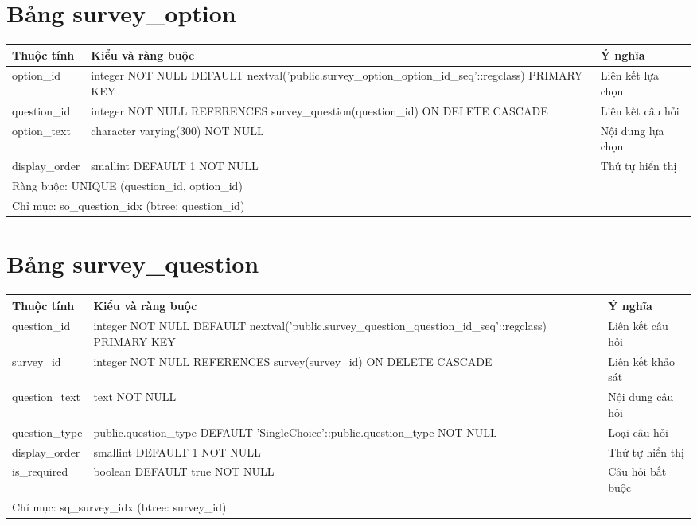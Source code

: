 \section{Bảng survey\_option}
\begin{longtable}{|p{}|p{}|p{}|}\hline
\textbf{Thuộc tính}&\textbf{Kiểu và ràng buộc}&\textbf{Ý nghĩa}\\\hline\endhead
option\_id & integer NOT NULL DEFAULT nextval('public.survey\_option\_option\_id\_seq'::regclass) PRIMARY KEY & Liên kết lựa chọn\\\hline
question\_id & integer NOT NULL REFERENCES survey\_question(question\_id) ON DELETE CASCADE & Liên kết câu hỏi\\\hline
option\_text & character varying(300) NOT NULL & Nội dung lựa chọn\\\hline
display\_order & smallint DEFAULT 1 NOT NULL & Thứ tự hiển thị\\\hline
\multicolumn{3}{|p{0.93\textwidth}|}{Ràng buộc: UNIQUE (question\_id, option\_id)}\\\hline
\multicolumn{3}{|p{0.93\textwidth}|}{Chỉ mục: so\_question\_idx (btree: question\_id)}\\\hline
\end{longtable}
\normalsize
\section{Bảng survey\_question}
\begin{longtable}{|p{}|p{}|p{}|}\hline
\textbf{Thuộc tính}&\textbf{Kiểu và ràng buộc}&\textbf{Ý nghĩa}\\\hline\endhead
question\_id & integer NOT NULL DEFAULT nextval('public.survey\_question\_question\_id\_seq'::regclass) PRIMARY KEY & Liên kết câu hỏi\\\hline
survey\_id & integer NOT NULL REFERENCES survey(survey\_id) ON DELETE CASCADE & Liên kết khảo sát\\\hline
question\_text & text NOT NULL & Nội dung câu hỏi\\\hline
question\_type & public.question\_type DEFAULT 'SingleChoice'::public.question\_type NOT NULL & Loại câu hỏi\\\hline
display\_order & smallint DEFAULT 1 NOT NULL & Thứ tự hiển thị\\\hline
is\_required & boolean DEFAULT true NOT NULL & Câu hỏi bắt buộc\\\hline
\multicolumn{3}{|p{0.93\textwidth}|}{Chỉ mục: sq\_survey\_idx (btree: survey\_id)}\\\hline
\end{longtable}
\normalsize

